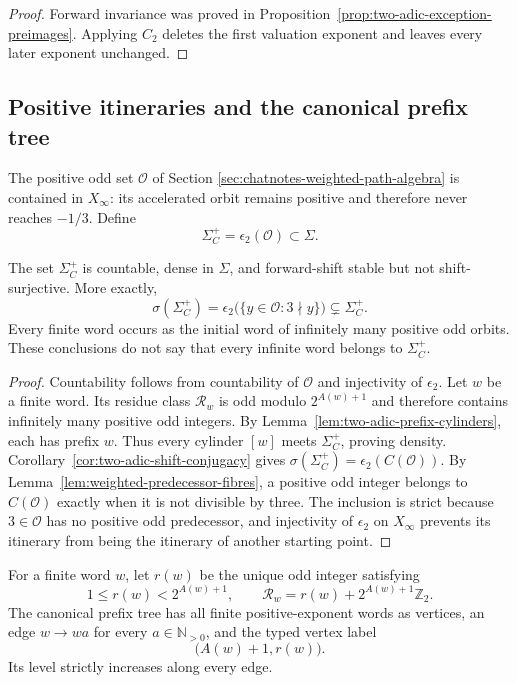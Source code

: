 \begin{proof}
Forward invariance was proved in
Proposition~\ref{prop:two-adic-exception-preimages}.  Applying $C_2$ deletes
the first valuation exponent and leaves every later exponent unchanged.
\end{proof}

\subsection{Positive itineraries and the canonical prefix tree}

The positive odd set $\mathcal O$ of Section
\ref{sec:chatnotes-weighted-path-algebra} is contained in $X_\infty$: its
accelerated orbit remains positive and therefore never reaches $-1/3$.
Define
\[
 \Sigma_C^+=\epsilon_2(\mathcal O)\subset\Sigma.
\]

\begin{proposition}
\label{prop:positive-itinerary-image}
The set $\Sigma_C^+$ is countable, dense in $\Sigma$, and forward-shift
stable but not shift-surjective.  More exactly,
\[
 \sigma(\Sigma_C^+)
 =\epsilon_2\bigl(\{y\in\mathcal O:3\nmid y\}\bigr)
 \subsetneq\Sigma_C^+.
\]
Every finite word occurs as the initial word of infinitely many positive odd
orbits.  These conclusions do not say that every infinite word belongs to
$\Sigma_C^+$.
\end{proposition}

\begin{proof}
Countability follows from countability of $\mathcal O$ and injectivity of
$\epsilon_2$.  Let $w$ be a finite word.  Its residue class
$\mathcal R_w$ is odd modulo $2^{A(w)+1}$ and therefore contains infinitely
many positive odd integers.  By Lemma~\ref{lem:two-adic-prefix-cylinders},
each has prefix $w$.  Thus every cylinder $[w]$ meets $\Sigma_C^+$, proving
density.  Corollary~\ref{cor:two-adic-shift-conjugacy} gives
$\sigma(\Sigma_C^+)=\epsilon_2(C(\mathcal O))$.  By
Lemma~\ref{lem:weighted-predecessor-fibres}, a positive odd integer belongs to
$C(\mathcal O)$ exactly when it is not divisible by three.  The inclusion is
strict because $3\in\mathcal O$ has no positive odd predecessor, and
injectivity of $\epsilon_2$ on $X_\infty$ prevents its itinerary from being
the itinerary of another starting point.
\end{proof}

\begin{definition}
\label{def:canonical-prefix-tree}
For a finite word $w$, let $r(w)$ be the unique odd integer satisfying
\[
 1\leq r(w)<2^{A(w)+1},
 \qquad
 \mathcal R_w=r(w)+2^{A(w)+1}\mathbb Z_2.
\]
The canonical prefix tree has all finite positive-exponent words as vertices,
an edge $w\to wa$ for every $a\in\mathbb N_{>0}$, and the typed vertex label
\[
 \bigl(A(w)+1,r(w)\bigr).
\]
Its level strictly increases along every edge.
\end{definition}

